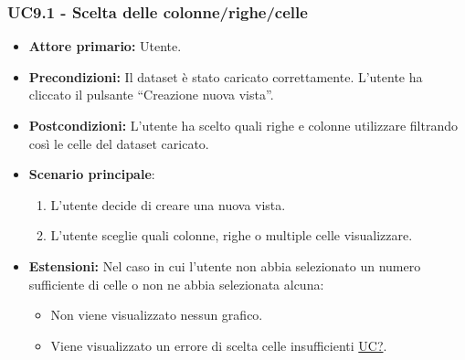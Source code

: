 \subsubsection{UC9.1 - Scelta delle colonne/righe/celle}
\label{sec:UC9.1}
\begin{itemize}
    \item \textbf{Attore primario:} Utente.
    \item \textbf{Precondizioni:} Il dataset è stato caricato correttamente. L'utente ha cliccato il pulsante ``Creazione nuova vista''.
    \item \textbf{Postcondizioni:} L'utente ha scelto quali righe e colonne utilizzare filtrando così le celle del dataset caricato.
    \item \textbf{Scenario principale}:
    \begin{enumerate}
		\item L'utente decide di creare una nuova vista.
		\item L'utente sceglie quali colonne, righe o multiple celle visualizzare.
	\end{enumerate}
	\item \textbf{Estensioni:} Nel caso in cui l'utente non abbia selezionato un numero sufficiente di celle o non ne abbia selezionata alcuna:
              \begin{itemize}
                  \item Non viene visualizzato nessun grafico.
                  \item Viene visualizzato un errore di scelta celle insufficienti \hyperref[sec:UC - Errore-celle-insufficienti]{UC?}.
              \end{itemize}
\end{itemize}



